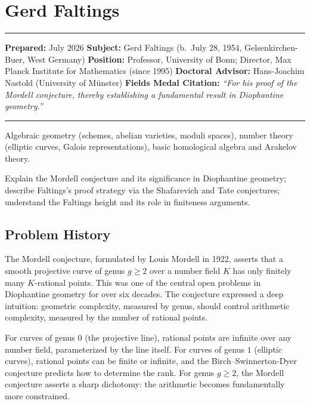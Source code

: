 \chapter{Gerd Faltings}\label{ch1986gerdfaltings:gerd-faltings-fields-medal-1986-a-comprehensive-report}

\begin{center}\rule{0.5\linewidth}{0.5pt}\end{center}

\textbf{Prepared:} July 2026 \textbf{Subject:} Gerd Faltings (b.~July 28, 1954, Gelsenkirchen-Buer, West Germany) \textbf{Position:} Professor, University of Bonn; Director, Max Planck Institute for Mathematics (since 1995) \textbf{Doctoral Advisor:} Hans-Joachim Nastold (University of M\"unster) \textbf{Fields Medal Citation:} \emph{``For his proof of the Mordell conjecture, thereby establishing a fundamental result in Diophantine geometry.''}

\begin{center}\rule{0.5\linewidth}{0.5pt}\end{center}

\begin{prereqs} Algebraic geometry (schemes, abelian varieties, moduli spaces), number theory (elliptic curves, Galois representations), basic homological algebra and Arakelov theory. \end{prereqs}

\begin{objectives} Explain the Mordell conjecture and its significance in Diophantine geometry; describe Faltings's proof strategy via the Shafarevich and Tate conjectures; understand the Faltings height and its role in finiteness arguments. \end{objectives}

\section{Problem History}

The Mordell conjecture, formulated by Louis Mordell in 1922, asserts that a smooth projective curve of genus $g \geq 2$ over a number field $K$ has only finitely many $K$-rational points. This was one of the central open problems in Diophantine geometry for over six decades. The conjecture expressed a deep intuition: geometric complexity, measured by genus, should control arithmetic complexity, measured by the number of rational points.

For curves of genus $0$ (the projective line), rational points are infinite over any number field, parameterized by the line itself. For curves of genus $1$ (elliptic curves), rational points can be finite or infinite, and the Birch--Swinnerton-Dyer conjecture predicts how to determine the rank. For genus $g \geq 2$, the Mordell conjecture asserts a sharp dichotomy: the arithmetic becomes fundamentally more constrained.

